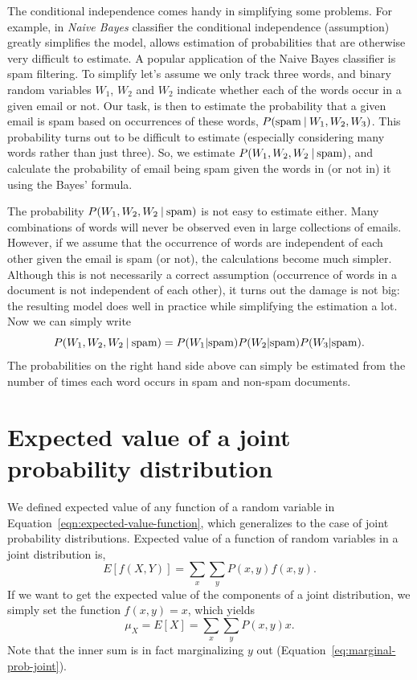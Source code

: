 The conditional independence comes handy in simplifying some problems.
For example, 
in \emph{Naive Bayes} classifier the conditional independence (assumption)
greatly simplifies the model,
allows estimation of probabilities that are otherwise very difficult to estimate.
A popular application of the Naive Bayes classifier is spam filtering.
To simplify let's assume we only track three words,
and binary random variables $W_{1}$, $W_{2}$ and $W_{2}$ indicate
whether each of the words occur in a given email or not.
Our task, is then to estimate the probability that a given email is spam
based on occurrences of these words,
$P(\text{spam}\:\vert\:{}W_{1}, W_{2}, W_{3})$.
This probability turns out to be difficult to estimate
(especially considering many words rather than just three).
So, we estimate
$P(W_{1}, W_{2}, W_{2}\:\vert\:\text{spam})$,
and calculate the probability of email being spam
given the words in (or not in) it using the Bayes' formula.


The probability $P(W_{1}, W_{2}, W_{2}\:\vert\:\text{spam})$
is not easy to estimate either.
Many combinations of words will never be observed even
in large collections of emails.
However,
if we assume that the occurrence of words are independent of each other
given the email is spam (or not),
the calculations become much simpler.
Although this is not necessarily a correct assumption
(occurrence of words in a document is not independent of each other),
it turns out the damage is not big:
the resulting model does well in practice
while simplifying the  estimation a lot.
Now we can simply write 
\[
  P(W_{1}, W_{2}, W_{2}\:\vert\:\text{spam}) = 
    P(W_{1}|\text{spam})
    P(W_{2}|\text{spam})
    P(W_{3}|\text{spam}).
\]
The probabilities on the right hand side above can simply be estimated
from the number of times each word occurs in spam and non-spam documents.

\section{Expected value of a joint probability distribution}

We defined expected value of any function of a random variable
in Equation~\ref{eqn:expected-value-function},
which generalizes to the case of joint probability distributions.
Expected value of a function of random variables in a joint distribution is,
\begin{equation}\label{eq:expected-value-joint}
  E[f(X,Y)] = \sum_{x} \sum_{y} P(x,y)f(x, y) .
\end{equation}
If we want to get the expected value of the components of a joint distribution,
we simply set the function $f(x,y) = x$,
which yields
\begin{equation}\label{eq:expected-value-joint2}
  \mu_{X} = E[X] = \sum_{x} \sum_{y} P(x,y) x .
\end{equation}
Note that the inner sum is in fact marginalizing $y$ out
(Equation~\ref{eq:marginal-prob-joint}).

